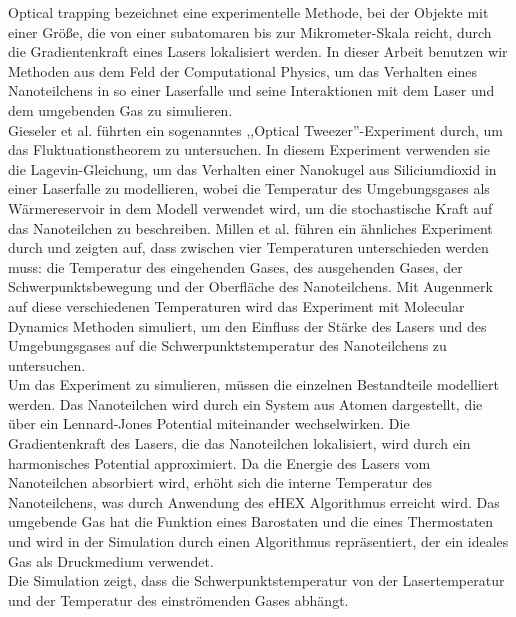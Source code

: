\documentclass[12pt]{article}
\begin{document}
Optical trapping bezeichnet eine experimentelle Methode, bei der Objekte mit einer Größe, die von einer subatomaren bis zur Mikrometer-Skala
reicht, durch die Gradientenkraft eines Lasers lokalisiert werden. In dieser Arbeit benutzen wir Methoden aus dem Feld der Computational Physics, 
um das Verhalten eines Nanoteilchens in so einer Laserfalle und seine Interaktionen mit dem Laser und dem umgebenden Gas zu simulieren.\\
Gieseler et al. führten ein sogenanntes ,,Optical Tweezer''-Experiment durch, um das Fluktuationstheorem zu untersuchen. In diesem Experiment
verwenden sie die Lagevin-Gleichung, um das Verhalten einer Nanokugel aus Siliciumdioxid in einer Laserfalle zu modellieren, wobei die 
Temperatur des Umgebungsgases als Wärmereservoir in dem Modell verwendet wird, um die stochastische Kraft auf das Nanoteilchen zu beschreiben. 
Millen et al. führen ein ähnliches Experiment durch und zeigten auf, dass zwischen vier Temperaturen unterschieden werden muss: die Temperatur 
des eingehenden Gases, des ausgehenden Gases, der Schwerpunktsbewegung und der Oberfläche des Nanoteilchens. Mit Augenmerk auf diese verschiedenen
Temperaturen wird das Experiment mit Molecular Dynamics Methoden simuliert, um den Einfluss der Stärke des Lasers und des Umgebungsgases auf 
die Schwerpunktstemperatur des Nanoteilchens zu untersuchen.\\
Um das Experiment zu simulieren, müssen die einzelnen Bestandteile modelliert werden. Das Nanoteilchen wird durch ein System aus Atomen 
dargestellt, die über ein Lennard-Jones Potential miteinander wechselwirken. Die Gradientenkraft des Lasers, die das Nanoteilchen lokalisiert, 
wird durch ein harmonisches Potential approximiert. Da die Energie des Lasers vom Nanoteilchen absorbiert wird, erhöht sich die interne 
Temperatur des Nanoteilchens, was durch Anwendung des eHEX Algorithmus erreicht wird. Das umgebende Gas hat die Funktion eines Barostaten und die 
eines Thermostaten und wird in der Simulation durch einen Algorithmus repräsentiert, der ein ideales Gas als Druckmedium verwendet.\\
Die Simulation zeigt, dass die Schwerpunktstemperatur von der Lasertemperatur und der Temperatur des einströmenden Gases abhängt. 
\end{document}
